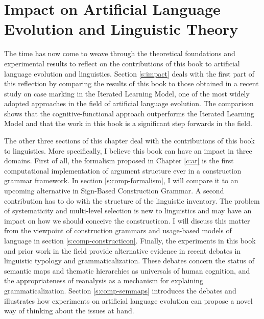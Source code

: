 
\setcounter{chapter}{4}
\chapter{Impact on Artificial Language Evolution and Linguistic Theory}
\label{c:impact}
\label{c:impact-linguistics}

The time has now come to weave through the theoretical foundations and experimental results to reflect on the contributions of this book to artificial language evolution and linguistics. Section \ref{s:impact} deals with the first part of this reflection by comparing the results of this book to those obtained in a recent study on case marking in the Iterated Learning Model, one of the most widely adopted approaches in the field of artificial language evolution. The comparison shows that the cognitive-functional approach outperforms the Iterated Learning Model and that the work in this book is a significant step forwards in the field.

The other three sections of this chapter deal with the contributions of this book to linguistics. More specifically, I believe this book can have an impact in three domains. First of all, the formalism proposed in Chapter \ref{c:ar} is the first computational implementation of argument structure ever in a construction grammar framework. In section \ref{s:comp-formalism}, I will compare it to an upcoming alternative in Sign-Based Construction Grammar. A second contribution has to do with the structure of the linguistic inventory. The problem of systematicity and multi-level selection is new to linguistics and may have an impact on how we should conceive the constructicon. I will discuss this matter from the viewpoint of construction grammars and usage-based models of language in section \ref{s:comp-constructicon}. Finally, the experiments in this book and prior work in the field provide alternative evidence in recent debates in linguistic typology and grammaticalization. These debates concern the status of semantic maps and thematic hierarchies as universals of human cognition, and the appropriateness of reanalysis as a mechanism for explaining grammaticalization. Section \ref{s:comp-semmaps} introduces the debates and illustrates how experiments on artificial language evolution can propose a novel way of thinking about the issues at hand.

